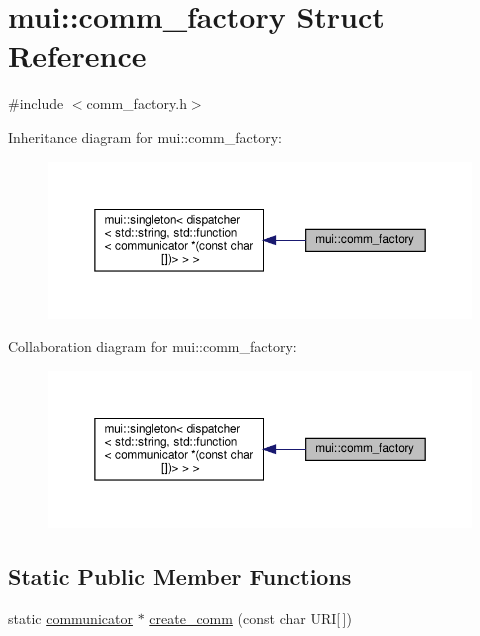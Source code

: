 \hypertarget{structmui_1_1comm__factory}{}\section{mui\+:\+:comm\+\_\+factory Struct Reference}
\label{structmui_1_1comm__factory}


{\ttfamily \#include $<$comm\+\_\+factory.\+h$>$}



Inheritance diagram for mui\+:\+:comm\+\_\+factory\+:
\nopagebreak
\begin{figure}[H]
\begin{center}
\leavevmode
\includegraphics[width=350pt]{structmui_1_1comm__factory__inherit__graph}
\end{center}
\end{figure}


Collaboration diagram for mui\+:\+:comm\+\_\+factory\+:
\nopagebreak
\begin{figure}[H]
\begin{center}
\leavevmode
\includegraphics[width=350pt]{structmui_1_1comm__factory__coll__graph}
\end{center}
\end{figure}
\subsection*{Static Public Member Functions}
\begin{DoxyCompactItemize}
\item 
static \hyperlink{classmui_1_1communicator}{communicator} $\ast$ \hyperlink{structmui_1_1comm__factory_adc8cb61ea9f3e4458d3e1c40969218c1}{create\+\_\+comm} (const char U\+RI\mbox{[}$\,$\mbox{]})
\end{DoxyCompactItemize}


